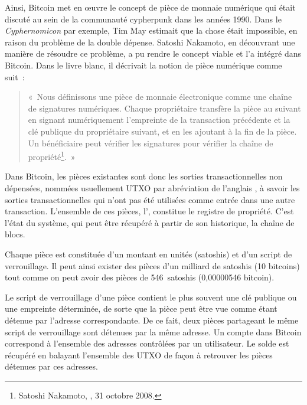 Ainsi, Bitcoin met en œuvre le concept de pièce de monnaie numérique qui était discuté au sein de la communauté cypherpunk dans les années 1990. Dans le \emph{Cyphernomicon} par exemple, Tim May estimait que la chose était impossible, en raison du problème de la double dépense. Satoshi Nakamoto, en découvrant une manière de résoudre ce problème, a pu rendre le concept viable et l'a intégré dans Bitcoin. Dans le livre blanc, il décrivait la notion de pièce numérique comme suit~:

\begin{quote}
«~Nous définissons une pièce de monnaie électronique comme une chaîne de signatures numériques. Chaque propriétaire transfère la pièce au suivant en signant numériquement l'empreinte de la transaction précédente et la clé publique du propriétaire suivant, et en les ajoutant à la fin de la pièce. Un bénéficiaire peut vérifier les signatures pour vérifier la chaîne de propriété\footnote{Satoshi Nakamoto, , 31 octobre 2008.}.~»
\end{quote}

Dans Bitcoin, les pièces existantes sont donc les sorties transactionnelles non dépensées, nommées usuellement UTXO par abréviation de l'anglais , à savoir les sorties transactionnelles qui n'ont pas été utilisées comme entrée dans une autre transaction. L'ensemble de ces pièces, l', constitue le registre de propriété. C'est l'état du système, qui peut être récupéré à partir de son historique, la chaîne de blocs.

Chaque pièce est constituée d'un montant en unités (satoshis) et d'un script de verrouillage. Il peut ainsi exister des pièces d'un milliard de satoshis (10 bitcoins) tout comme on peut avoir des pièces de 546~satoshis (0,00000546 bitcoin).

Le script de verrouillage d'une pièce contient le plus souvent une clé publique ou une empreinte déterminée, de sorte que la pièce peut être vue comme étant détenue par l'adresse correspondante. De ce fait, deux pièces partageant le même script de verrouillage sont détenues par la même adresse. Un compte dans Bitcoin correspond à l'ensemble des adresses contrôlées par un utilisateur. Le solde est récupéré en balayant l'ensemble des UTXO de façon à retrouver les pièces détenues par ces adresses.

